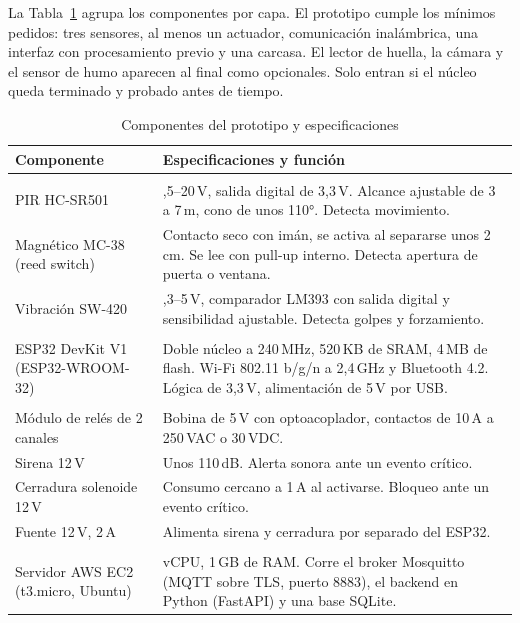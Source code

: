 \documentclass[conference]{IEEEtran}
\begin{document}
La Tabla~\ref{tab:componentes} agrupa los componentes por capa. El prototipo cumple los mínimos pedidos: tres sensores, al menos un actuador, comunicación inalámbrica, una interfaz con procesamiento previo y una carcasa. El lector de huella, la cámara y el sensor de humo aparecen al final como opcionales. Solo entran si el núcleo queda terminado y probado antes de tiempo.

\begin{table}[!t]
\centering
\caption{Componentes del prototipo y especificaciones}
\label{tab:componentes}
\footnotesize
\renewcommand{\arraystretch}{1.15}
\begin{tabular}{@{}>{\raggedright\arraybackslash}p{2.35cm}>{\raggedright\arraybackslash}p{5.65cm}@{}}
\toprule
\textbf{Componente} & \textbf{Especificaciones y función} \\
\midrule
\multicolumn{2}{@{}l}{\textit{Sensores}} \\
PIR HC-SR501 & 4,5--20\,V, salida digital de 3,3\,V. Alcance ajustable de 3 a 7\,m, cono de unos 110°. Detecta movimiento. \\
Magnético MC-38 (reed switch) & Contacto seco con imán, se activa al separarse unos 2\,cm. Se lee con pull-up interno. Detecta apertura de puerta o ventana. \\
Vibración SW-420 & 3,3--5\,V, comparador LM393 con salida digital y sensibilidad ajustable. Detecta golpes y forzamiento. \\
\midrule
\multicolumn{2}{@{}l}{\textit{Procesamiento y comunicación}} \\
ESP32 DevKit V1 (ESP32-WROOM-32) & Doble núcleo a 240\,MHz, 520\,KB de SRAM, 4\,MB de flash. Wi-Fi 802.11 b/g/n a 2,4\,GHz y Bluetooth 4.2. Lógica de 3,3\,V, alimentación de 5\,V por USB. \\
\midrule
\multicolumn{2}{@{}l}{\textit{Actuación}} \\
Módulo de relés de 2 canales & Bobina de 5\,V con optoacoplador, contactos de 10\,A a 250\,VAC o 30\,VDC. \\
Sirena 12\,V & Unos 110\,dB. Alerta sonora ante un evento crítico. \\
Cerradura solenoide 12\,V & Consumo cercano a 1\,A al activarse. Bloqueo ante un evento crítico. \\
Fuente 12\,V, 2\,A & Alimenta sirena y cerradura por separado del ESP32. \\
\midrule
\multicolumn{2}{@{}l}{\textit{Interfaz y nube}} \\
Servidor AWS EC2 (t3.micro, Ubuntu) & 2 vCPU, 1\,GB de RAM. Corre el broker Mosquitto (MQTT sobre TLS, puerto 8883), el backend en Python (FastAPI) y una base SQLite. \\

\end{tabular}
\end{table}
\end{document}
